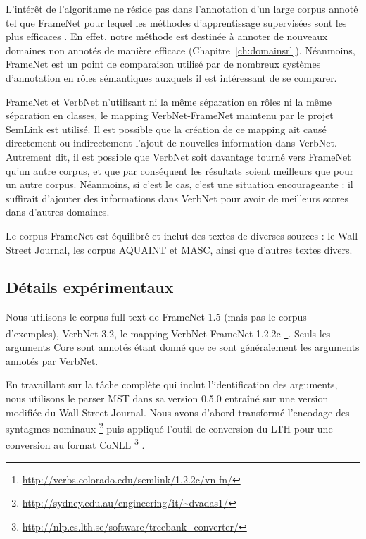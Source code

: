 L'intérêt de l'algorithme ne réside pas dans l'annotation d'un large corpus
annoté tel que FrameNet pour lequel les méthodes d'apprentissage supervisées
sont les plus efficaces \citep{das2014frame}. En effet, notre méthode est
destinée à annoter de nouveaux domaines non annotés de manière efficace
(Chapitre~\ref{ch:domainsrl}). Néanmoins, FrameNet est un point de comparaison
utilisé par de nombreux systèmes d'annotation en rôles sémantiques auxquels il
est intéressant de se comparer.

FrameNet et VerbNet n'utilisant ni la même séparation en rôles ni la même
séparation en classes, le mapping VerbNet-FrameNet maintenu par le projet
SemLink est utilisé. Il est possible que la création de ce mapping ait causé
directement ou indirectement l'ajout de nouvelles information dans VerbNet.
Autrement dit, il est possible que VerbNet soit davantage tourné vers FrameNet
qu'un autre corpus, et que par conséquent les résultats soient meilleurs que
pour un autre corpus. Néanmoins, si c'est le cas, c'est une situation
encourageante : il suffirait d'ajouter des informations dans VerbNet pour avoir
de meilleurs scores dans d'autres domaines.

Le corpus FrameNet est équilibré et inclut des textes de diverses sources : le
Wall Street Journal, les corpus AQUAINT et MASC, ainsi que d'autres textes
divers.

\subsection{Détails expérimentaux}
\label{subsec:corpora_tools}

Nous utilisons le corpus full-text de FrameNet 1.5 (mais pas le corpus
d'exemples), VerbNet 3.2, le mapping VerbNet-FrameNet 1.2.2c
\footnote{\url{http://verbs.colorado.edu/semlink/1.2.2c/vn-fn/}}. Seuls les
arguments Core sont annotés étant donné que ce sont généralement les arguments
annotés par VerbNet.

En travaillant sur la tâche complète qui inclut l'identification des arguments,
nous utilisons le parser MST dans sa version 0.5.0
\citep{mcdonald2006multilingual} entraîné sur une version modifiée du Wall
Street Journal. Nous avons d'abord transformé l'encodage des syntagmes nominaux
\footnote{\url{http://sydney.edu.au/engineering/it/~dvadas1/}}
\citep{vadas2007adding} puis appliqué l'outil de conversion du LTH pour une
conversion au format CoNLL
\footnote{\url{http://nlp.cs.lth.se/software/treebank_converter/}}
\citep{johansson2007extended}.

